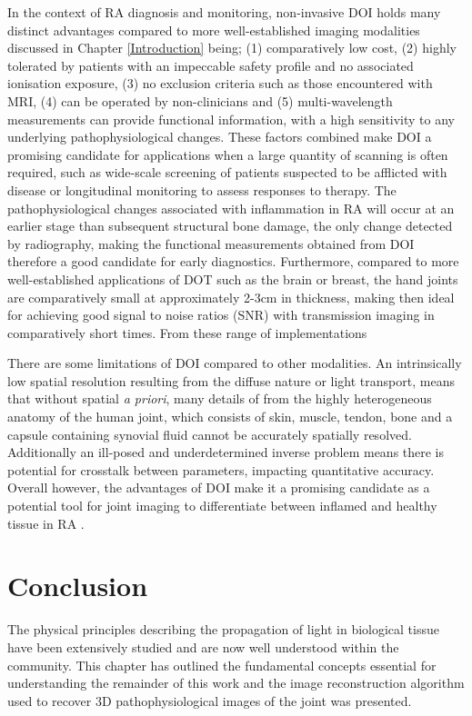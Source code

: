\documentclass[twoside]{bhamthesis}
\theoremstyle{definition}
\begin{document}
In the context of RA diagnosis and monitoring, non-invasive DOI holds many distinct advantages compared to more well-established imaging modalities discussed in Chapter \ref{Introduction} being; (1) comparatively low cost, (2) highly tolerated by patients with an impeccable safety profile and no associated ionisation exposure, (3) no exclusion criteria such as those encountered with MRI, (4) can be operated by non-clinicians and (5) multi-wavelength measurements can provide functional information, with a high sensitivity to any underlying pathophysiological changes. These factors combined make DOI a promising candidate for applications when a large quantity of scanning is often required, such as wide-scale screening of patients suspected to be afflicted with disease or longitudinal monitoring to assess responses to therapy. The pathophysiological changes associated with inflammation in RA will occur at an earlier stage than subsequent structural bone damage, the only change detected by radiography, making the functional measurements obtained from DOI therefore a good candidate for early diagnostics. Furthermore, compared to more well-established applications of DOT such as the brain or breast, the hand joints are comparatively small at approximately 2-3cm in thickness, making then ideal for achieving good signal to noise ratios (SNR) with transmission imaging in comparatively short times. From these range of implementations

There are some limitations of DOI compared to other modalities. An intrinsically low spatial resolution resulting from the diffuse nature or light transport, means that without spatial \textit{a priori}, many details of from the highly heterogeneous anatomy of the human joint, which consists of skin, muscle, tendon, bone and a capsule containing synovial fluid cannot be accurately spatially resolved. Additionally an ill-posed and underdetermined inverse problem means there is potential for crosstalk between parameters, impacting quantitative accuracy. Overall however, the advantages of DOI make it a promising candidate as a potential tool for joint imaging to differentiate between inflamed and healthy tissue in RA \cite{golovko2011optical}. 

\section{Conclusion}

The physical principles describing the propagation of light in biological tissue have been extensively studied and are now well understood within the community. This chapter has outlined the fundamental concepts essential for understanding the remainder of this work and the image reconstruction algorithm used to recover 3D pathophysiological images of the joint was presented. 
\end{document}

